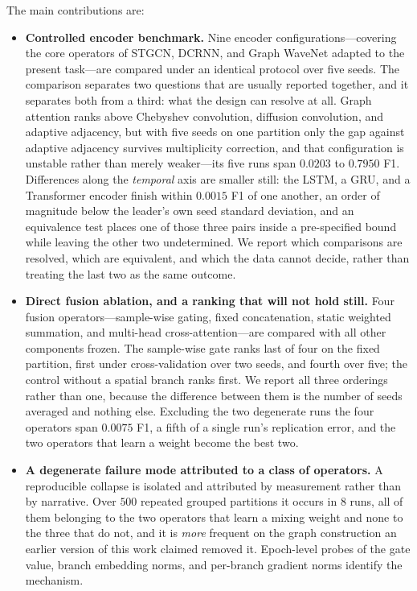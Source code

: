 \documentclass[journal]{IEEEtran}
\begin{document}
The main contributions are:
\begin{itemize}
  \item \textbf{Controlled encoder benchmark.} Nine encoder configurations---covering the core operators of STGCN, DCRNN, and Graph WaveNet adapted to the present task---are compared under an identical protocol over five seeds. The comparison separates two questions that are usually reported together, and it separates both from a third: what the design can resolve at all. Graph attention ranks above Chebyshev convolution, diffusion convolution, and adaptive adjacency, but with five seeds on one partition only the gap against adaptive adjacency survives multiplicity correction, and that configuration is unstable rather than merely weaker---its five runs span $0.0203$ to $0.7950$ F1. Differences along the \emph{temporal} axis are smaller still: the LSTM, a GRU, and a Transformer encoder finish within $0.0015$ F1 of one another, an order of magnitude below the leader's own seed standard deviation, and an equivalence test places one of those three pairs inside a pre-specified bound while leaving the other two undetermined. We report which comparisons are resolved, which are equivalent, and which the data cannot decide, rather than treating the last two as the same outcome.  %
  \item \textbf{Direct fusion ablation, and a ranking that will not hold still.} Four fusion operators---sample-wise gating, fixed concatenation, static weighted summation, and multi-head cross-attention---are compared with all other components frozen. The sample-wise gate ranks last of four on the fixed partition, first under cross-validation over two seeds, and fourth over five; the control without a spatial branch ranks first. We report all three orderings rather than one, because the difference between them is the number of seeds averaged and nothing else. Excluding the two degenerate runs the four operators span $0.0075$ F1, a fifth of a single run's replication error, and the two operators that learn a weight become the best two.
  \item \textbf{A degenerate failure mode attributed to a class of operators.} A reproducible collapse is isolated and attributed by measurement rather than by narrative. Over $500$ repeated grouped partitions it occurs in $8$ runs, all of them belonging to the two operators that learn a mixing weight and none to the three that do not, and it is \emph{more} frequent on the graph construction an earlier version of this work claimed removed it. Epoch-level probes of the gate value, branch embedding norms, and per-branch gradient norms identify the mechanism.

\end{itemize}
\end{document}
